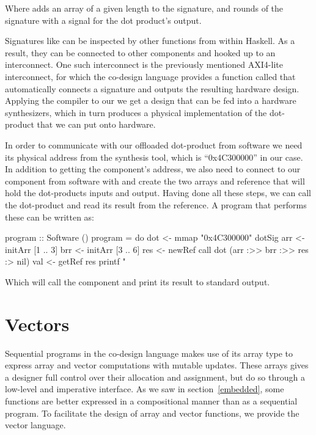 \documentclass[../paper.tex]{subfiles}
\begin{document}
\noindent Where  adds an array of a given length to the signature, and  rounds of the signature with a signal for the dot product's output.

Signatures like  can be inspected by other functions from within Haskell. As a result, they can be connected to other components and hooked up to an interconnect. One such interconnect is the previously mentioned AXI4-lite interconnect, for which the co-design language provides a function called  that automatically connects a signature and outputs the resulting hardware design. Applying the compiler to our  we get a design that can be fed into a hardware synthesizers, which in turn produces a physical implementation of the dot-product that we can put onto hardware.

In order to communicate with our offloaded dot-product from software we need its physical address from the synthesis tool, which is ``0x4C300000'' in our case. In addition to getting the component's address, we also need to connect to our component from software with  and create the two arrays and reference that will hold the dot-products inputs and output. Having done all these steps, we can call the dot-product and read its result from the reference. A program that performs these can be written as:

\begin{code}
program :: Software ()
program = do
  dot <- mmap "0x4C300000" dotSig
  arr <- initArr [1 .. 3]
  brr <- initArr [3 .. 6]
  res <- newRef
  call dot (arr :>> brr :>> res :> nil)
  val <- getRef res
  printf "%
\end{code}

\noindent Which will call the component and print its result to standard output.

\section{Vectors}

Sequential programs in the co-design language makes use of its array type to express array and vector computations with mutable updates. These arrays gives a designer full control over their allocation and assignment, but do so through a low-level and imperative interface. As we saw in section~\ref{embedded}, some functions are better expressed in a compositional manner than as a sequential program. To facilitate the design of array and vector functions, we provide the vector language. 
\end{document}
